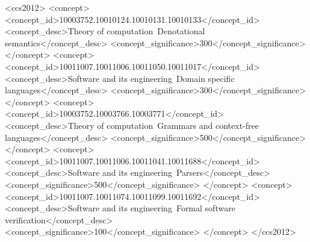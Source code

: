 \documentclass[acmsmall,nonacm]{acmart}
\begin{document}
\begin{CCSXML}
<ccs2012>
   <concept>
       <concept_id>10003752.10010124.10010131.10010133</concept_id>
       <concept_desc>Theory of computation~Denotational semantics</concept_desc>
       <concept_significance>300</concept_significance>
       </concept>
   <concept>
       <concept_id>10011007.10011006.10011050.10011017</concept_id>
       <concept_desc>Software and its engineering~Domain specific languages</concept_desc>
       <concept_significance>300</concept_significance>
       </concept>
   <concept>
       <concept_id>10003752.10003766.10003771</concept_id>
       <concept_desc>Theory of computation~Grammars and context-free languages</concept_desc>
       <concept_significance>500</concept_significance>
       </concept>
   <concept>
       <concept_id>10011007.10011006.10011041.10011688</concept_id>
       <concept_desc>Software and its engineering~Parsers</concept_desc>
       <concept_significance>500</concept_significance>
       </concept>
   <concept>
       <concept_id>10011007.10011074.10011099.10011692</concept_id>
       <concept_desc>Software and its engineering~Formal software verification</concept_desc>
       <concept_significance>100</concept_significance>
       </concept>
 </ccs2012>
\end{CCSXML}


\ifarxiv
\else
{}  %
\fi

\maketitle
\end{document}
